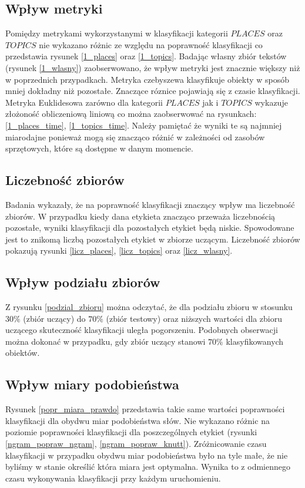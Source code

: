 \documentclass{classrep}
\begin{document}
\subsection{Wpływ metryki}
Pomiędzy metrykami wykorzystanymi w klasyfikacji kategorii $PLACES$ oraz $TOPICS$ nie wykazano
różnic ze względu na
poprawność klasyfikacji co przedstawia rysunek \ref{1_places} oraz \ref{1_topics}. Badając własny
zbiór tekstów (rysunek \ref{1_wlasny}) zaobserwowano, że wpływ metryki jest znacznie większy niż w poprzednich przypadkach.
Metryka czebyszewa klasyfikuje obiekty w sposób mniej dokładny niż pozostałe.
Znaczące róznice
pojawiają się z czasie klasyfikacji. Metryka Euklidesowa zarówno dla kategorii $PLACES$ jak i $TOPICS$
wykazuje złożoność obliczeniową liniową co można zaobserwować na rysunkach: \ref{1_places_time},
\ref{1_topics_time}. Należy pamiętać że wyniki te są najmniej miarodajne ponieważ mogą się znacząco
różnić w zależności od zasobów sprzętowych, które są dostępne w danym momencie.

\subsection{Liczebność zbiorów}
Badania wykazały, że na poprawność klasyfikacji znaczący wpływ ma liczebność zbiorów. W przypadku
kiedy dana etykieta znacząco przeważa liczebnością pozostałe, wyniki klasyfikacji dla pozostałych
etykiet będą niskie. Spowodowane jest to znikomą liczbą pozostałych etykiet w zbiorze uczącym.
Liczebność zbiorów pokazują rysunki \ref{licz_places}, \ref{licz_topics} oraz \ref{licz_wlasny}.

\subsection{Wpływ podziału zbiorów}
Z rysunku \ref{podzial_zbioru} można odczytać, że dla podziału zbioru w
stosunku $30\%$ (zbiór uczący) do $70\%$ (zbiór testowy) oraz niższych wartości dla zbioru uczącego
skuteczność klasyfikacji uległa pogorszeniu. Podobnych obserwacji można dokonać w przypadku, gdy
zbiór uczący stanowi $70\%$
klasyfikowanych obiektów.

\subsection{Wpływ miary podobieństwa}
Rysunek \ref{popr_miara_prawdo} przedstawia takie same wartości poprawności klasyfikacji dla obydwu
miar podobieństwa słów. Nie wykazano różnic na poziomie poprawności klasyfikacji dla poszczególnych
etykiet (rysunki \ref{ngram_popraw_ngram}, \ref{ngram_popraw_knutt}). Zróżnicowanie czasu klasyfikacji
w przypadku obydwu miar podobieństwa było na tyle małe, że nie byliśmy w stanie określić która
miara jest optymalna. Wynika to z odmiennego czasu wykonywania klasyfikacji przy każdym uruchomieniu.
\end{document}
